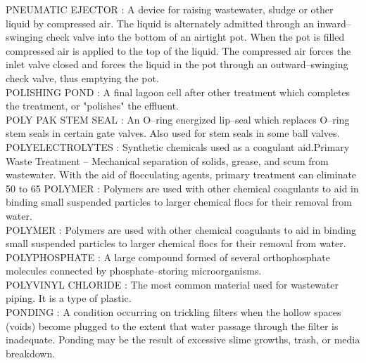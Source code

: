 \vspace{0.15cm}
PNEUMATIC EJECTOR :  A device for raising wastewater, sludge or other liquid by compressed air. The liquid is alternately admitted through an inward–swinging check valve into the bottom of an airtight pot. When the pot is filled compressed air is applied to the top of the liquid. The compressed air forces the inlet valve closed and forces the liquid in the pot through an outward–swinging check valve, thus emptying the pot. \\
\vspace{0.15cm}
POLISHING POND :  A final lagoon cell after other treatment which completes the treatment, or "polishes" the effluent.\\
\vspace{0.15cm}
POLY PAK STEM SEAL :   An O–ring energized lip–seal which replaces O–ring stem seals in certain gate valves. Also used for stem seals in some ball valves.\\
\vspace{0.15cm}
POLYELECTROLYTES :   Synthetic chemicals used as a coagulant aid.Primary Waste Treatment –  Mechanical separation of solids, grease, and scum from wastewater. With the aid of flocculating agents, primary treatment can eliminate 50 to 65%
\vspace{0.15cm}
POLYMER :  Polymers are used with other chemical coagulants to aid in binding small suspended particles to larger chemical flocs for their removal from water.\\
\vspace{0.15cm}
POLYMER :  Polymers are used with other chemical coagulants to aid in binding small suspended particles to larger chemical flocs for their removal from water.\\
\vspace{0.15cm}
POLYPHOSPHATE :   A large compound formed of several orthophosphate molecules connected by phosphate–storing microorganisms.\\
\vspace{0.15cm}
POLYVINYL CHLORIDE :   The most common material used for wastewater piping. It is a type of plastic.\\
\vspace{0.15cm}
PONDING :  A condition occurring on trickling filters when the hollow spaces (voids) become plugged to the extent that water passage through the filter is inadequate. Ponding may be the result of excessive slime growths, trash, or media breakdown.\\
